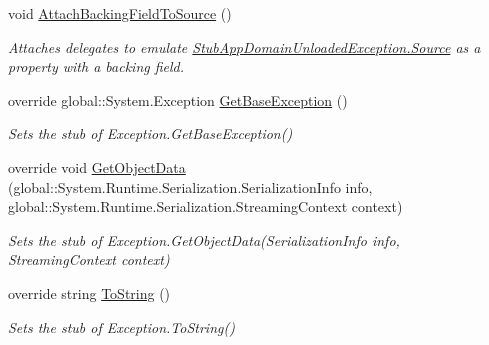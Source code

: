 \begin{DoxyCompactItemize}
void \hyperlink{class_system_1_1_fakes_1_1_stub_app_domain_unloaded_exception_aed6358edb77bb9fda6913e4509a19782}{Attach\-Backing\-Field\-To\-Source} ()
\begin{DoxyCompactList}\small\item\em Attaches delegates to emulate \hyperlink{class_system_1_1_fakes_1_1_stub_app_domain_unloaded_exception_a92ae2598bf382599ad534db51c271c23}{Stub\-App\-Domain\-Unloaded\-Exception.\-Source} as a property with a backing field.\end{DoxyCompactList}\item 
override global\-::\-System.\-Exception \hyperlink{class_system_1_1_fakes_1_1_stub_app_domain_unloaded_exception_ad8d5e03714e63707ab3d41a8d504ae8b}{Get\-Base\-Exception} ()
\begin{DoxyCompactList}\small\item\em Sets the stub of Exception.\-Get\-Base\-Exception()\end{DoxyCompactList}\item 
override void \hyperlink{class_system_1_1_fakes_1_1_stub_app_domain_unloaded_exception_a99232e572e18aa33f15fb52f18189552}{Get\-Object\-Data} (global\-::\-System.\-Runtime.\-Serialization.\-Serialization\-Info info, global\-::\-System.\-Runtime.\-Serialization.\-Streaming\-Context context)
\begin{DoxyCompactList}\small\item\em Sets the stub of Exception.\-Get\-Object\-Data(\-Serialization\-Info info, Streaming\-Context context)\end{DoxyCompactList}\item 
override string \hyperlink{class_system_1_1_fakes_1_1_stub_app_domain_unloaded_exception_a0485dc8b5c540e3ac8de0a401e75ea09}{To\-String} ()
\begin{DoxyCompactList}\small\item\em Sets the stub of Exception.\-To\-String()\end{DoxyCompactList}\end{DoxyCompactItemize}
